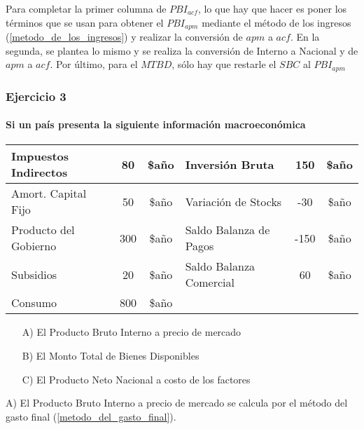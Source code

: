 \documentclass[12pt,a4paper]{article}
\newcommand{\consigna}[1]{\paragraph{\indent #1} \hspace{0pt}}
\begin{document}
        \par{
        	Para completar la primer columna de $PBI_{acf}$, lo que hay que hacer es poner los términos que se usan para obtener el $PBI_{apm}$ mediante el método de los ingresos (\ref{metodo_de_los_ingresos}) y realizar la conversión de $apm$ a $acf$.
            En la segunda, se plantea lo mismo y se realiza la conversión de Interno a Nacional y de $apm$ a $acf$.
            Por último, para el $MTBD$, sólo hay que restarle el $SBC$ al $PBI_{apm}$
        	}
        
        
        \newpage
    
    	\subsubsection{Ejercicio 3}
        
        \consigna{Si un país presenta la siguiente información macroeconómica}
        
        \begin{table}[H]
        \centering
        	\begin{tabular}{ | l | c | c | l | c | c | }
            \hline
            Impuestos Indirectos	& 80	& \$año	& Inversión Bruta		& 150 & \$año \\ \hline
            Amort. Capital Fijo		& 50	& \$año	& Variación de Stocks	& -30 & \$año \\ \hline
            Producto del Gobierno	& 300	& \$año	& Saldo Balanza de Pagos &-150 & \$año \\ \hline
            Subsidios				& 20	& \$año	& Saldo Balanza Comercial & 60 & \$año \\ \hline
            Consumo					& 800	& \$año	& & & \\ \hline
			\end{tabular}
		\end{table}
        
        \begin{itemize}
			\item[A)]	El Producto Bruto Interno a precio de mercado
            \item[B)]	El Monto Total de Bienes Disponibles
            \item[C)]	El Producto Neto Nacional a costo de los factores
		\end{itemize}
        
        A) El Producto Bruto Interno a precio de mercado se calcula por el método del gasto final (\ref{metodo_del_gasto_final}).
        
\end{document}
